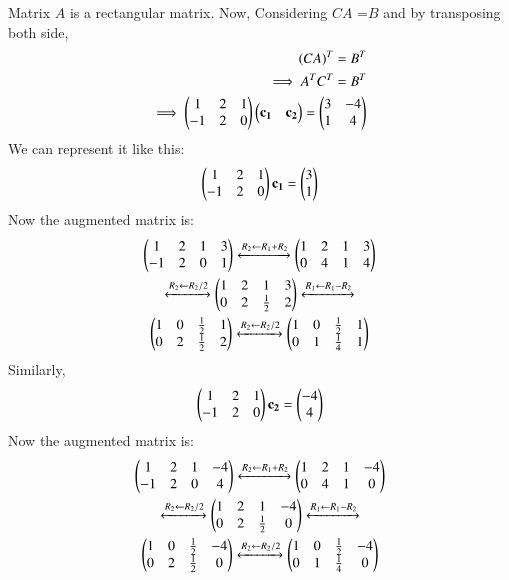 Matrix $A$ is a rectangular matrix.
Now, Considering $CA$ =$B$ and by transposing both side,
\begin{align}
(CA)^T = B^T\\
\implies A^T C^T = B^T\\
\implies \begin{pmatrix}1 & 2 & 1\\-1 & 2 & 0\end{pmatrix} \begin{pmatrix}\mathbf{c_1} & \mathbf{c_2}\end{pmatrix} = \begin{pmatrix}3 & -4\\1 & 4\end{pmatrix}
\end{align}
We can represent it like this:
\begin{align}
\begin{pmatrix}1 & 2 & 1\\-1 & 2 & 0\end{pmatrix} \mathbf{c_1} = \begin{pmatrix}3\\1\end{pmatrix}\\
\end{align}
Now the augmented matrix is:
\begin{multline}
\begin{pmatrix}1 & 2 & 1 & 3\\-1 & 2 & 0 & 1\end{pmatrix}\xleftrightarrow[]{R_2\leftarrow R_1+R_2}\begin{pmatrix}1 & 2 & 1 & 3\\0 & 4 & 1 & 4\end{pmatrix}\\ 
\xleftrightarrow[]{R_2\leftarrow R_2/2}\begin{pmatrix}1 & 2 & 1 & 3\\0 & 2 & \frac{1}{2} & 2\end{pmatrix}\xleftrightarrow[]{R_1\leftarrow R_1-R_2}\\
\begin{pmatrix}1 & 0 & \frac{1}{2} & 1\\0 & 2 & \frac{1}{2} & 2\end{pmatrix}\xleftrightarrow[]{R_2\leftarrow R_2/2}\begin{pmatrix}1 & 0 & \frac{1}{2} & 1\\0 & 1 & \frac{1}{4} & 1\end{pmatrix}
\label{eq:solutions/1/4/5/eqn:1}
\end{multline}
Similarly,
\begin{align}
\begin{pmatrix}1 & 2 & 1\\-1 & 2 & 0\end{pmatrix} \mathbf{c_2} = \begin{pmatrix}-4\\4\end{pmatrix}\\
\end{align}
Now the augmented matrix is:
\begin{multline}
\begin{pmatrix}1 & 2 & 1 & -4\\-1 & 2 & 0 & 4\end{pmatrix}\xleftrightarrow[]{R_2\leftarrow R_1+R_2}\begin{pmatrix}1 & 2 & 1 & -4\\0 & 4 & 1 & 0\end{pmatrix}\\ 
\xleftrightarrow[]{R_2\leftarrow R_2/2}\begin{pmatrix}1 & 2 & 1 & -4\\0 & 2 & \frac{1}{2} & 0\end{pmatrix}\xleftrightarrow[]{R_1\leftarrow R_1-R_2}\\
\begin{pmatrix}1 & 0 & \frac{1}{2} & -4\\0 & 2 & \frac{1}{2} & 0\end{pmatrix}\xleftrightarrow[]{R_2\leftarrow R_2/2}\begin{pmatrix}1 & 0 & \frac{1}{2} & -4\\0 & 1 & \frac{1}{4} & 0\end{pmatrix}
\label{eq:solutions/1/4/5/eqn:2}
\end{multline}
